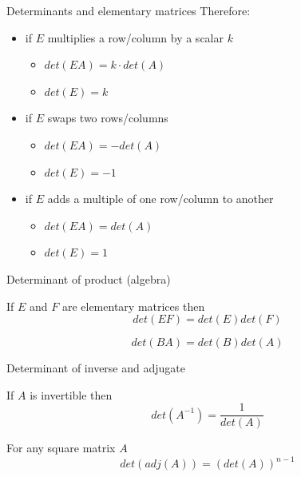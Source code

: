 \documentclass{beamer}
\begin{document}
\begin{frame}{Determinants and elementary matrices}
  Therefore:\vfill
  \begin{itemize}
  \item if $E$ multiplies a row/column by a scalar $k$
    \begin{itemize}
    \item $det(EA)=k\cdot det(A)$
    \item $det(E)=k$
    \end{itemize}\vfill
  \item if $E$ swaps two rows/columns
    \begin{itemize}
    \item $det(EA) = -det(A)$
    \item $det(E) = -1$
    \end{itemize}\vfill
  \item if $E$ adds a multiple of one row/column to another
    \begin{itemize}
    \item $det(EA) = det(A)$
    \item $det(E) = 1$
    \end{itemize}
  \end{itemize}
\end{frame}

\begin{frame}{Determinant of product (algebra)}
  \begin{lemma}
    If $E$ and $F$ are elementary matrices then
    \begin{equation*}
      det(EF) = det(E)det(F)
    \end{equation*}
  \end{lemma}\vfill
  \begin{theorem}
    \begin{equation*}
      det(BA) = det(B)det(A)
    \end{equation*}
  \end{theorem}
\end{frame}

\begin{frame}{Determinant of inverse and adjugate}
  \begin{theorem}
    If $A$ is invertible then
    \begin{equation*}
      det(A^{-1}) = \frac{1}{det(A)}
    \end{equation*}
  \end{theorem}
  \begin{theorem}
    For any square matrix $A$
    \begin{equation*}
      det(adj(A)) = (det(A))^{n-1}
    \end{equation*}
  \end{theorem}
\end{frame}
\end{document}
